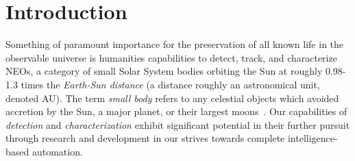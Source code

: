 \chapter{Introduction}

Something of paramount importance for the preservation of all known life in the observable universe is humanities capabilities to detect, track, and characterize \glspl{NEO}, a category of small Solar System bodies orbiting the Sun at roughly 0.98-1.3 times the \textit{Earth-Sun distance} (a distance roughly an astronomical unit, denoted AU). The term \textit{small body} refers to any celestial objects which avoided accretion by the Sun, a major planet, or their largest moons~\cite{Davidsson2021}. Our capabilities of \textit{detection} and \textit{characterization} exhibit significant potential in their further pursuit through research and development in our strives towards complete intelligence-based automation. %

